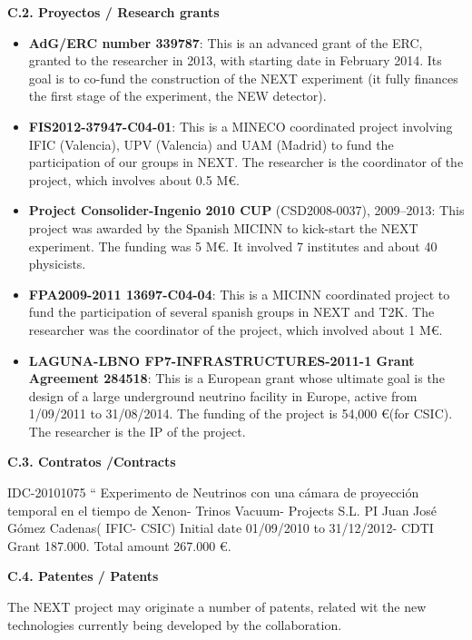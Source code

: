 \documentclass[a4paper,11pt,oneside]{article}
\begin{document}
\vspace{6pt}
\noindent\textbf{C.2. Proyectos / Research grants}
\begin{itemize}

\item {\bf AdG/ERC number 339787}: This is an advanced grant of the ERC, granted to the researcher in 2013, with starting date in February 2014. Its goal is to co-fund the construction of the NEXT experiment (it fully finances the first stage of the experiment, the NEW detector). 
% 
\item {\bf FIS2012-37947-C04-01}: This is a MINECO coordinated project involving IFIC (Valencia),  UPV (Valencia) and UAM (Madrid) to fund the participation of our groups in NEXT. The researcher is the coordinator of the project, which involves about 0.5 M\euro.
\item {\bf Project Consolider-Ingenio 2010 CUP} (CSD2008-0037), 2009--2013: This project was awarded by the Spanish MICINN to kick-start the NEXT experiment. The funding was 5 M\euro. It involved 7 institutes and about 40 physicists. 
\item {\bf FPA2009-2011 13697-C04-04}: This is a MICINN coordinated project to fund the participation of several spanish groups in NEXT and T2K. The researcher was the coordinator of the project, which involved about 1 M\euro.
\item {\bf LAGUNA-LBNO FP7-INFRASTRUCTURES-2011-1 Grant Agreement 284518}: This is a European grant whose ultimate goal is the design of a large underground neutrino facility in Europe, active from 1/09/2011 to 31/08/2014. The funding of the project is 54,000 \euro (for CSIC). The researcher is the IP of the project. 
\end{itemize}
%
\vspace{6pt}

\noindent\textbf{C.3. Contratos /Contracts}

IDC-20101075 “ Experimento de Neutrinos con una cámara de proyección temporal en el tiempo de Xenon- Trinos Vacuum- Projects S.L. PI Juan José Gómez Cadenas( IFIC- CSIC) Initial date 01/09/2010 to 31/12/2012- CDTI Grant 187.000. Total amount 267.000 €.

\vspace{6pt}

\noindent\textbf{C.4. Patentes / Patents}

The NEXT project may originate a number of patents, related wit the new technologies currently being developed by the collaboration.
\end{document}
